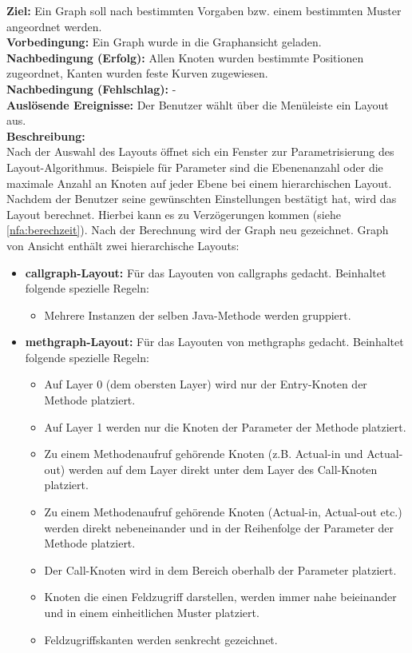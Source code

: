\label{fa:layout}
\textbf{Ziel:} Ein Graph soll nach bestimmten Vorgaben bzw. einem bestimmten Muster angeordnet werden.\\
\textbf{Vorbedingung:} Ein Graph wurde in die Graphansicht geladen.\\
\textbf{Nachbedingung (Erfolg):} Allen Knoten wurden bestimmte Positionen zugeordnet, Kanten wurden feste Kurven zugewiesen.\\
\textbf{Nachbedingung (Fehlschlag):} -\\
\textbf{Auslösende Ereignisse:}
Der Benutzer wählt über die Menüleiste ein Layout aus.\\
\textbf{Beschreibung:}\\
Nach der Auswahl des Layouts öffnet sich ein Fenster zur Parametrisierung des Layout-Algorithmus.
Beispiele für Parameter sind die Ebenenanzahl oder die maximale Anzahl an Knoten auf jeder Ebene bei einem hierarchischen Layout.
Nachdem der Benutzer seine gewünschten Einstellungen bestätigt hat, wird das Layout berechnet. Hierbei kann es zu Verzögerungen kommen (siehe \ref{nfa:berechzeit}).
Nach der Berechnung wird der Graph neu gezeichnet.
Graph von Ansicht enthält zwei hierarchische Layouts:
\begin{itemize}
  \item \textbf{\gls{callgraph}-Layout:} Für das Layouten von \glspl{callgraph} gedacht. Beinhaltet folgende spezielle Regeln:
    \begin{itemize}
      \item Mehrere Instanzen der selben Java-Methode werden gruppiert.
    \end{itemize}
  \item \textbf{\gls{methgraph}-Layout:} Für das Layouten von \glspl{methgraph} gedacht. Beinhaltet folgende spezielle Regeln:
    \begin{itemize}
      \item Auf Layer 0 (dem obersten Layer) wird nur der Entry-Knoten der Methode platziert.
      \item Auf Layer 1 werden nur die Knoten der Parameter der Methode platziert.
      \item Zu einem Methodenaufruf gehörende Knoten (z.B. Actual-in und Actual-out) werden auf dem Layer direkt unter dem Layer des Call-Knoten platziert.
      \item Zu einem Methodenaufruf gehörende Knoten (Actual-in, Actual-out etc.) werden direkt nebeneinander und in der Reihenfolge der Parameter der Methode platziert.
      \item Der Call-Knoten wird in dem Bereich oberhalb der Parameter platziert.
      \item Knoten die einen Feldzugriff darstellen, werden immer nahe beieinander und in einem einheitlichen Muster platziert. %
      \item Feldzugriffskanten werden senkrecht gezeichnet.
    \end{itemize}
\end{itemize}
